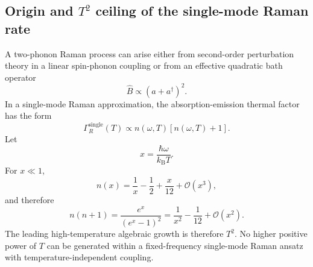 \documentclass[12pt,a4paper]{article}
\begin{document}
\subsection{Origin and $T^2$ ceiling of the single-mode Raman rate}
A two-phonon Raman process can arise either from second-order perturbation theory in a linear spin-phonon coupling or from an effective quadratic bath operator
\begin{equation}
\hat B\propto(a+a^\dagger)^2.
\end{equation}
In a single-mode Raman approximation, the absorption-emission thermal factor has the form
\begin{equation}
\Gamma_R^{\mathrm{single}}(T) \propto n(\omega,T)[n(\omega,T)+1].
\label{eq:single_mode_raman}
\end{equation}
Let
\begin{equation}
x=\frac{\hbar\omega}{k_{\mathrm B}T}.
\end{equation}
For $x\ll1$,
\begin{equation}
n(x) = \frac{1}{x} - \frac{1}{2} + \frac{x}{12} + \mathcal O(x^3),
\end{equation}
and therefore
\begin{equation}
n(n+1) = \frac{e^x}{(e^x-1)^2} = \frac{1}{x^2} - \frac{1}{12} + \mathcal O(x^2).
\label{eq:nnplusone_expansion}
\end{equation}
The leading high-temperature algebraic growth is therefore $T^2$. No higher positive power of $T$ can be generated within a fixed-frequency single-mode Raman ansatz with temperature-independent coupling.
\end{document}
